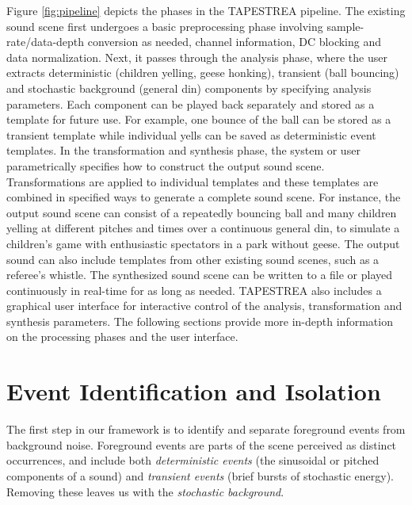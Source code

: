 \documentclass[a4paper]{article}
\begin{document}
Figure \ref{fig:pipeline} depicts the phases in the TAPESTREA pipeline. The existing sound scene first
undergoes a basic preprocessing phase involving sample-rate/data-depth 
conversion as needed, channel information, DC blocking and data normalization. Next, it passes through the 
analysis phase, where the user extracts deterministic (children yelling, geese honking), 
transient (ball bouncing) and stochastic background (general din) 
components by specifying analysis parameters. Each component can be played back separately 
and stored as a template for future use. For example, one bounce of the ball can 
be stored as a transient template while individual yells can be saved as deterministic event 
templates. In the transformation and synthesis phase, the system or user parametrically specifies 
how to construct the output sound scene. Transformations are applied to individual 
templates and these templates are combined in specified ways to generate a complete sound scene. 
For instance, the output sound scene can consist of a repeatedly bouncing ball and many children yelling 
at different pitches and times over a continuous general din, to simulate a 
children's game with enthusiastic spectators in a park without geese. The output sound can also 
include templates from other existing sound scenes, such as a referee's whistle. The synthesized 
sound scene can be written to a file or played continuously in real-time 
for as long as needed. TAPESTREA also includes a graphical user interface for interactive control 
of the analysis, transformation and synthesis parameters. The following sections provide more in-depth 
information on the processing phases and the user interface. 

\section{Event Identification and Isolation}

The first step in our framework is to identify and separate foreground events from 
background noise. Foreground events are parts of the scene perceived as distinct occurrences, and 
include both \emph{deterministic events} (the 
sinusoidal or pitched components of a sound) and \emph{transient events} (brief bursts 
of stochastic energy). Removing these leaves us with the \emph{stochastic background}. 

\end{document}
